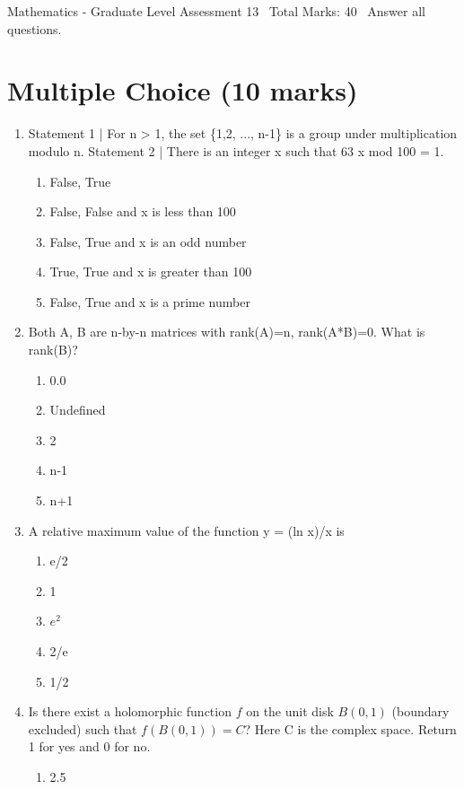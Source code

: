 \documentclass[12pt]{article}
\begin{document}
\begin{center}
Mathematics - Graduate Level Assessment 13 \
Total Marks: 40 \
Answer all questions.
\end{center}

\section*{Multiple Choice (10 marks)}
\begin{enumerate}[label=\arabic*.]
\item Statement 1 | For n \textgreater{} 1, the set \{1,2, ..., n-1\} is a group under multiplication modulo n. Statement 2 | There is an integer x such that 63 x mod 100 = 1.
\begin{enumerate}[label=(\alph*)]
    \item False, True
    \item False, False and x is less than 100
    \item False, True and x is an odd number
    \item True, True and x is greater than 100
    \item False, True and x is a prime number
\end{enumerate}
\item Both A, B are n-by-n matrices with rank(A)=n, rank(A*B)=0. What is rank(B)?
\begin{enumerate}[label=(\alph*)]
    \item 0.0
    \item Undefined
    \item 2
    \item n-1
    \item n+1
\end{enumerate}
\item A relative maximum value of the function y = (ln x)/x is
\begin{enumerate}[label=(\alph*)]
    \item e/2
    \item 1
    \item $e^2$
    \item 2/e
    \item 1/2
\end{enumerate}
\item Is there exist a holomorphic function $f$ on the unit disk $B(0,1)$ (boundary excluded) such that $f(B(0,1))=C$? Here C is the complex space. Return 1 for yes and 0 for no.
\begin{enumerate}[label=(\alph*)]
    \item 2.5

\end{enumerate}
\end{enumerate}
\end{document}
